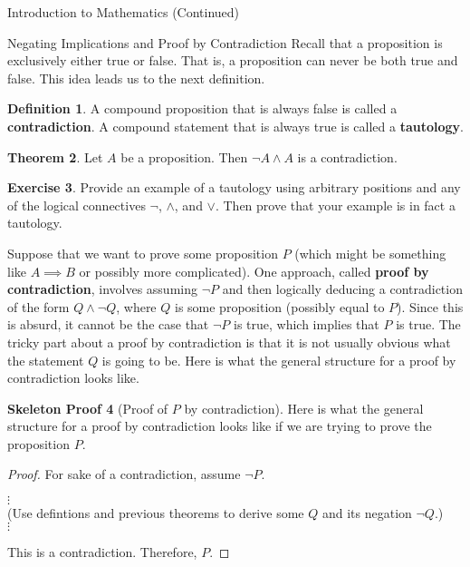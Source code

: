 \documentclass[11pt]{article}
\theoremstyle{definition}
\newtheorem{theorem}{Theorem}[section]
\newtheorem{definition}[theorem]{Definition}
\newtheorem{exercise}[theorem]{Exercise}
\newtheorem{skeleton}[theorem]{Skeleton Proof}
\newenvironment{textbox}{\noindent\begin{lrbox}{\savepar}\begin{minipage}[c]{.98\textwidth}}{\end{minipage}\end{lrbox}\fcolorbox{black}{white}{\usebox{\savepar}}}
\begin{document}
\begin{section}{Introduction to Mathematics (Continued)}
\begin{subsection}{Negating Implications and Proof by Contradiction}
Recall that a proposition is exclusively either true or false.  That is, a proposition can never be both true and false.  This idea leads us to the next definition.

\begin{definition}
A compound proposition that is always false is called a \textbf{contradiction}.  A compound statement that is always true is called a \textbf{tautology}.
\end{definition}

\begin{theorem}
Let $A$ be a proposition. Then $\neg A\wedge A$ is a contradiction.
\end{theorem}

\begin{exercise}
Provide an example of a tautology using arbitrary positions and any of the logical connectives $\neg$, $\wedge$, and $\vee$.  Then prove that your example is in fact a tautology.
\end{exercise}

Suppose that we want to prove some proposition $P$ (which might be something like $A\implies B$ or possibly more complicated).  One approach, called \textbf{proof by contradiction}, involves assuming $\neg P$ and then logically deducing a contradiction of the form $Q\wedge \neg Q$, where $Q$ is some proposition (possibly equal to $P$).  Since this is absurd, it cannot be the case that $\neg P$ is true, which implies that $P$ is true.  The tricky part about a proof by contradiction is that it is not usually obvious what the statement $Q$ is going to be.  Here is what the general structure for a proof by contradiction looks like.

\bigskip

\begin{skeleton}[Proof of $P$ by contradiction]
Here is what the general structure for a proof by contradiction looks like if we are trying to prove the proposition $P$.

\bigskip

\begin{textbox}
\begin{proof}
For sake of a contradiction, assume $\neg P$.
\begin{center}
$\vdots$\\
(Use defintions and previous theorems to derive some $Q$ and its negation $\neg Q$.)\\
$\vdots$
\end{center}
\noindent This is a contradiction.  Therefore, $P$.
\end{proof}
\end{textbox}


\end{skeleton}
\end{subsection}
\end{section}
\end{document}
